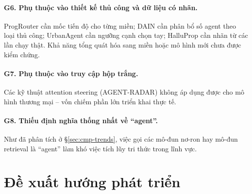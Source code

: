 \paragraph{G6. Phụ thuộc vào thiết kế thủ công và dữ liệu có nhãn.} ProgRouter cần mốc tiến độ cho từng miền; DAIN cần phân bổ số agent theo loại thủ công; UrbanAgent cần ngưỡng cạnh chọn tay; HalluProp cần nhãn từ các lần chạy thật. Khả năng tổng quát hóa sang miền hoặc mô hình mới chưa được kiểm chứng.

\paragraph{G7. Phụ thuộc vào truy cập hộp trắng.} Các kỹ thuật attention steering (AGENT-RADAR) không áp dụng được cho mô hình thương mại -- vốn chiếm phần lớn triển khai thực tế.

\paragraph{G8. Thiếu định nghĩa thống nhất về ``agent''.} Như đã phân tích ở \S\ref{sec:cmp-trends}, việc gọi các mô-đun nơ-ron hay mô-đun retrieval là ``agent'' làm khó việc tích lũy tri thức trong lĩnh vực.

\section{Đề xuất hướng phát triển}

